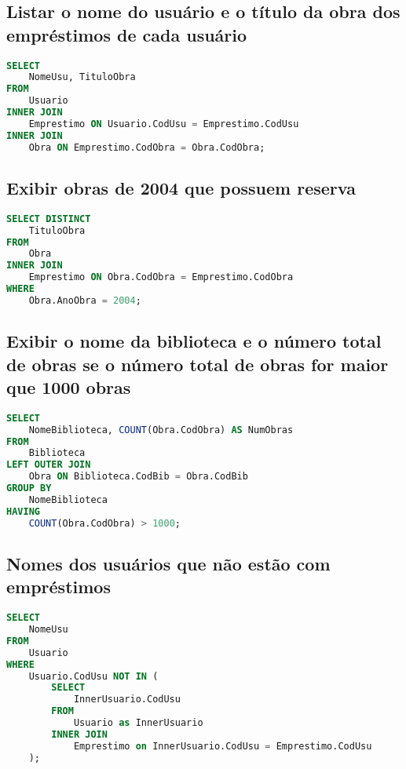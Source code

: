 \documentclass[12pt]{article}
\begin{document}
    \subsection{Listar o nome do usuário e o título da obra dos empréstimos de cada usuário}
      \begin{lstlisting}[language=SQL]
SELECT
    NomeUsu, TituloObra
FROM
    Usuario
INNER JOIN
    Emprestimo ON Usuario.CodUsu = Emprestimo.CodUsu
INNER JOIN
    Obra ON Emprestimo.CodObra = Obra.CodObra;
      \end{lstlisting}
    \subsection{Exibir obras de 2004 que possuem reserva}
      \begin{lstlisting}[language=SQL]
SELECT DISTINCT
    TituloObra
FROM
    Obra
INNER JOIN
    Emprestimo ON Obra.CodObra = Emprestimo.CodObra
WHERE
    Obra.AnoObra = 2004;
      \end{lstlisting}
    \subsection{Exibir o nome da biblioteca e o número total de obras se o número total de obras for maior que 1000 obras}
      \begin{lstlisting}[language=SQL]
SELECT
    NomeBiblioteca, COUNT(Obra.CodObra) AS NumObras
FROM
    Biblioteca
LEFT OUTER JOIN
    Obra ON Biblioteca.CodBib = Obra.CodBib
GROUP BY
    NomeBiblioteca
HAVING
    COUNT(Obra.CodObra) > 1000;
      \end{lstlisting}
    \subsection{Nomes dos usuários que não estão com empréstimos}
      \begin{lstlisting}[language=SQL]
SELECT
    NomeUsu
FROM
    Usuario
WHERE
    Usuario.CodUsu NOT IN (
        SELECT
            InnerUsuario.CodUsu
        FROM
            Usuario as InnerUsuario
        INNER JOIN
            Emprestimo on InnerUsuario.CodUsu = Emprestimo.CodUsu
    );
      \end{lstlisting}
\end{document}

